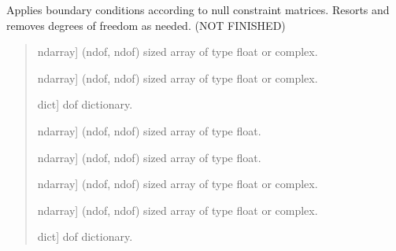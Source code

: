 \documentclass[letterpaper,10pt,english]{sphinxmanual}
\begin{document}
\begin{fulllineitems}
\label{\detokenize{core:pywfe.core.model_setup.apply_boundary_conditions}}
\pysigstartsignatures
{}
\pysigstopsignatures
\sphinxAtStartPar
Applies boundary conditions according to null constraint matrices.
Resorts and removes degrees of freedom as needed. (NOT FINISHED)
\begin{quote}\begin{description}
\begin{description}
\sphinxlineitem{\sphinxstylestrong{K}}{[}ndarray{]}
\sphinxAtStartPar
(ndof, ndof) sized array of type float or complex.

\sphinxlineitem{\sphinxstylestrong{M}}{[}ndarray{]}
\sphinxAtStartPar
(ndof, ndof) sized array of type float or complex.

\sphinxlineitem{\sphinxstylestrong{dof}}{[}dict{]}
\sphinxAtStartPar
dof dictionary.

\sphinxlineitem{\sphinxstylestrong{null}}{[}ndarray{]}
\sphinxAtStartPar
(ndof, ndof) sized array of type float.

\sphinxlineitem{\sphinxstylestrong{nullf}}{[}ndarray{]}
\sphinxAtStartPar
(ndof, ndof) sized array of type float.

\end{description}

\begin{description}
\sphinxlineitem{\sphinxstylestrong{K}}{[}ndarray{]}
\sphinxAtStartPar
(ndof, ndof) sized array of type float or complex.

\sphinxlineitem{\sphinxstylestrong{M}}{[}ndarray{]}
\sphinxAtStartPar
(ndof, ndof) sized array of type float or complex.

\sphinxlineitem{\sphinxstylestrong{dof}}{[}dict{]}
\sphinxAtStartPar
dof dictionary.

\end{description}

\end{description}\end{quote}

\end{fulllineitems}

\end{document}
